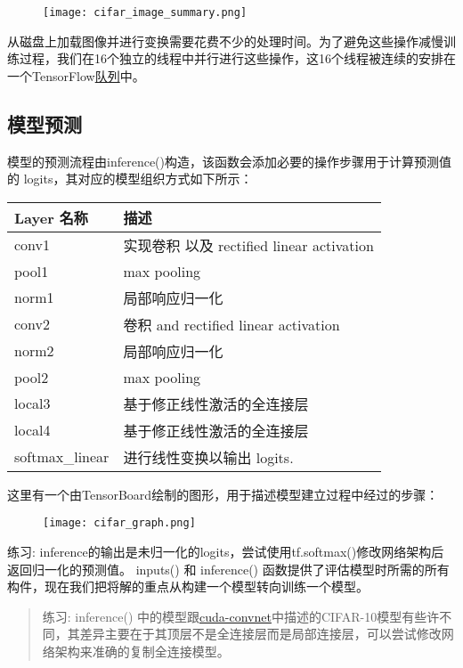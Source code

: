 \begin{figure}[H]
	\centering
	\texttt{[image: cifar\_image\_summary.png]}
\end{figure}
从磁盘上加载图像并进行变换需要花费不少的处理时间。为了避免这些操作减慢训练过程，我们在16个独立的线程中并行进行这些操作，这16个线程被连续的安排在一个TensorFlow\href{https://www.tensorflow.org/api_docs/python/tf/train/shuffle_batch}{队列}中。
\subsection{模型预测}
模型的预测流程由inference()构造，该函数会添加必要的操作步骤用于计算预测值的 logits，其对应的模型组织方式如下所示：

\begin{table}[!h]
	\centering
	\begin{tabular}{|p{2cm}|p{8cm}|}
	\hline
	Layer 名称&描述\\
	\hline
	conv1&实现卷积 以及 rectified linear activation\\
	\hline
	pool1&max pooling\\
	\hline
	norm1&局部响应归一化\\
	\hline
	conv2&卷积 and rectified linear activation\\
	\hline
	norm2&局部响应归一化\\
	\hline
	pool2&max pooling\\
	\hline
	local3&基于修正线性激活的全连接层\\
	\hline
	local4&基于修正线性激活的全连接层\\
	\hline
	softmax\_linear&进行线性变换以输出 logits.\\
	\hline
	\end{tabular}
\end{table}
这里有一个由TensorBoard绘制的图形，用于描述模型建立过程中经过的步骤：

\begin{figure}[H]
\centering
\texttt{[image: cifar\_graph.png]}
\end{figure}

练习: inference的输出是未归一化的logits，尝试使用tf.softmax()修改网络架构后返回归一化的预测值。
inputs() 和 inference() 函数提供了评估模型时所需的所有构件，现在我们把将解的重点从构建一个模型转向训练一个模型。

\begin{quote}
练习: inference() 中的模型跟\href{https://code.google.com/p/cuda-convnet/}{cuda-convnet}中描述的CIFAR-10模型有些许不同，其差异主要在于其顶层不是全连接层而是局部连接层，可以尝试修改网络架构来准确的复制全连接模型。
\end{quote}

